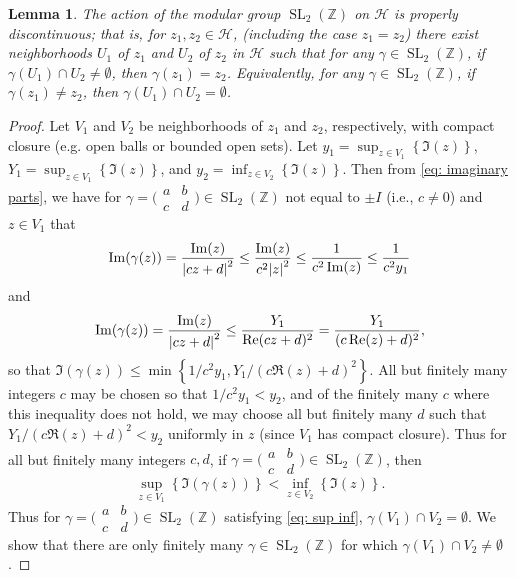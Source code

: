 \documentclass[10pt,leqno,twoside]{article}
\theoremstyle{plain}
\newtheorem{lemma}[lem]{Lemma}
\theoremstyle{definition}
\numberwithin{equation}{section}
\numberwithin{lem}{section}
\newcommand{\cbr}[1]{\left\{#1\right\}}
\DeclareMathOperator{\SL}{SL}
\newcommand{\slz}{\SL_2(\mathbb{Z})}
\begin{document}
\begin{lemma}
    The action of the modular group $\slz$ on $\mathcal H$ is properly discontinuous; that is, for $z_1,z_2\in \mathcal H$, (including the case $z_1 = z_2$) there exist neighborhoods $U_1$ of $z_1$ and $U_2$ of $z_2$ in $\mathcal H$ such that for any $\gamma\in \slz$, if $\gamma(U_1)\cap U_2\neq \emptyset$, then $\gamma(z_1) = z_2$. Equivalently, for any $\gamma\in\slz$, if $\gamma(z_1)\neq z_2$, then $\gamma(U_1)\cap U_2= \emptyset$.
\end{lemma}
\begin{proof}
    Let $V_1$ and $V_2$ be neighborhoods of $z_1$ and $z_2$, respectively, with compact closure (e.g. open balls or bounded open sets). Let $y_1 = \sup_{z\in V_1}\cbr{\Im(z)}$, $Y_1 = \sup_{z\in V_1}\cbr{\Im(z)}$, and $y_2 = \inf_{z\in V_2}\cbr{\Im(z)}$. Then from \cref{eq: imaginary parts}, we have for $\gamma = \big(\!\begin{smallmatrix}
        a & b \\ c & d
    \end{smallmatrix}\!\big)\in \slz$ not equal to $\pm I$ (i.e., $c\neq 0$) and $z\in V_1$ that \[\Im(\gamma(z)) = \frac{\Im(z)}{\abs{cz+d}^2}\leq \frac{\Im(z)}{c^2\abs{z}^2}\leq \frac{1}{c^2\Im(z)}\leq \frac{1}{c^2y_1}\] and \[\Im(\gamma(z)) = \frac{\Im(z)}{\abs{cz+d}^2}\leq \frac{Y_1}{\Re(cz+d)^2} = \frac{Y_1}{(c\Re(z)+d)^2},\] so that $\Im(\gamma(z))\leq\min\cbr{1/c^2y_1,Y_1/(c\Re(z)+d)^2}$. All but finitely many integers $c$ may be chosen so that $1/c^2y_1< y_2$, and of the finitely many $c$ where this inequality does not hold, we may choose all but finitely many $d$ such that $Y_1/(c\Re(z)+d)^2< y_2$ uniformly in $z$ (since $V_1$ has compact closure). Thus for all but finitely many integers $c,d$, if $\gamma  = \big(\!\begin{smallmatrix}
        a & b \\ c & d
    \end{smallmatrix}\!\big)\in \slz$, then \begin{equation}\label{eq: sup inf}
        \sup_{z\in V_1}\cbr{\Im(\gamma(z))}< \inf_{z\in V_2}\cbr{\Im(z)}.
    \end{equation} Thus for $\gamma = \big(\!\begin{smallmatrix}
        a & b \\ c & d
    \end{smallmatrix}\!\big)\in \slz$ satisfying \cref{eq: sup inf}, $\gamma(V_1)\cap V_2=\emptyset$. We show that there are only finitely many $\gamma\in \slz$ for which $\gamma(V_1)\cap V_2\neq\emptyset$.


\end{proof}
\end{document}
